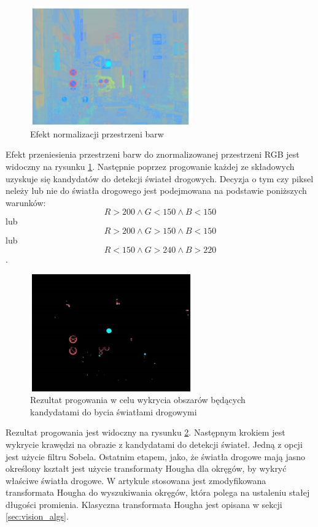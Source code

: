 \begin{figure}
  \centering
  \includegraphics[width=7cm]{img/tl_norm.png}
  \caption{Efekt normalizacji przestrzeni barw\cite{T4}}
  \label{fig:tl_norm}
\end{figure}

Efekt przeniesienia przestrzeni barw do znormalizowanej przestrzeni RGB jest widoczny na rysunku \ref{fig:tl_norm}.
Następnie poprzez progowanie każdej ze składowych uzyskuje się kandydatów do detekcji świateł drogowych. Decyzja o tym czy piksel neleży lub nie do światła drogowego jest podejmowana na podstawie poniższych warunków:
\begin{equation}
R>200 \wedge G< 150 \wedge B<150
\end{equation}
lub
\begin{equation}
R>200 \wedge G> 150 \wedge B<150
\end{equation} 
lub
\begin{equation}
R<150 \wedge G>240 \wedge B>220
\end{equation}.

\begin{figure}
  \centering
  \includegraphics[width=7cm]{img/tl_thresh.png}
  \caption{Rezultat progowania w celu wykrycia obszarów będących kandydatami do bycia światłami drogowymi\cite{T4}}
  \label{fig:tl_thresh}
\end{figure}

Rezultat progowania jest widoczny na rysunku \ref{fig:tl_thresh}. Następnym krokiem jest wykrycie krawędzi na obrazie z kandydatami do detekcji świateł. Jedną z opcji jest użycie filtru Sobela. Ostatnim etapem, jako, że światła drogowe mają jasno określony kształt jest użycie transformaty Hougha dla okręgów, by wykryć właściwe światła drogowe. W artykule stosowana jest zmodyfikowana transformata Hougha do wyszukiwania okręgów, która polega na ustaleniu stałej długości promienia. Klasyczna transformata Hougha jest opisana w sekcji \ref{sec:vision_algs}.

